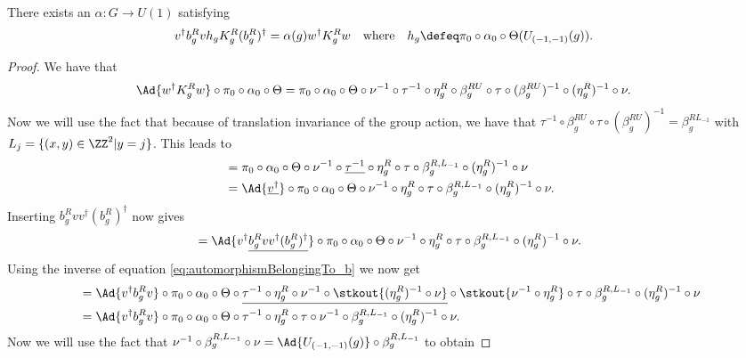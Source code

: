 \begin{lemma}\label{lem:DefinitionAlpha}
	There exists an $\alpha:G\rightarrow U(1)$ satisfying
	\begin{align}\label{eq:DefinitionOfTheH_1Index}
		v^\dagger b_g^R vh_g K_g^R (b_g^R)^\dagger&=\alpha(g)w^\dagger K_g^R w&&\text{where}&h_g&\defeq\pi_0\circ\alpha_0\circ\Theta(U_{(-1,-1)}(g)).
	\end{align}
\end{lemma}
\begin{proof}
	We have that
	\begin{align}
		&\Ad{w^\dagger K_g^R w}\circ\pi_0\circ\alpha_0\circ\Theta=\pi_0\circ\alpha_0\circ\Theta\circ\nu^{-1}\circ\tau^{-1}\circ\eta_g^R\circ\beta_g^{RU}\circ\tau\circ(\beta_g^{RU})^{-1}\circ(\eta_g^R)^{-1}\circ\nu.
	\end{align}
	Now we will use the fact that because of translation invariance of the group action, we have that $\tau^{-1}\circ\beta_g^{RU}\circ\tau\circ(\beta_g^{RU})^{-1}=\beta_g^{RL_{-1}}$ with $L_j=\{(x,y)\in\ZZ^2|y=j\}$. This leads to
	\begin{align}
		&=\pi_0\circ\alpha_0\circ\Theta\circ\nu^{-1}\circ\underline{\tau^{-1}}\circ\eta_g^R\circ\tau\circ\beta_g^{R,L_{-1}}\circ(\eta_g^R)^{-1}\circ\nu\\
		\nonumber
		&=\Ad{\underline{v^\dagger}}\circ \pi_0\circ\alpha_0\circ\Theta\circ\nu^{-1}\circ\eta_g^R\circ\tau\circ\beta_g^{R,L_{-1}}\circ(\eta_g^R)^{-1}\circ\nu.
	\end{align}
	Inserting $b^R_g v v^\dagger (b^R_g)^\dagger$ now gives
	\begin{equation}
		=\Ad{v^\dagger\underline{b^R_g v v^\dagger (b^R_g)^\dagger}}\circ \pi_0\circ\alpha_0\circ\Theta\circ\nu^{-1}\circ\eta_g^R\circ\tau\circ\beta_g^{R,L_{-1}}\circ(\eta_g^R)^{-1}\circ\nu.
	\end{equation}
	Using the inverse of equation \eqref{eq:automorphismBelongingTo_b} we now get
	\begin{align}
		&=\Ad{v^\dagger b^R_g v }\circ \pi_0\circ\alpha_0\circ\Theta\circ\underline{\tau^{-1}\circ\eta_g^R\circ\nu^{-1}\circ\stkout{(\eta_g^R)^{-1}\circ\nu}}\circ\stkout{\nu^{-1}\circ\eta_g^R}\circ\tau\circ\beta_g^{R,L_{-1}}\circ(\eta_g^R)^{-1}\circ\nu\\
		\nonumber
		&=\Ad{v^\dagger b_g^R v}\circ\pi_0\circ\alpha_0\circ\Theta\circ\tau^{-1}\circ\eta_g^R\circ\tau\circ\nu^{-1}\circ\beta_g^{R,L_{-1}}\circ(\eta_g^R)^{-1}\circ\nu.
	\end{align}
	Now we will use the fact that $\nu^{-1}\circ\beta_g^{R,L_{-1}}\circ\nu=\Ad{U_{(-1,-1)}(g)}\circ\beta_g^{R,L_{-1}}$ to obtain

\end{proof}
